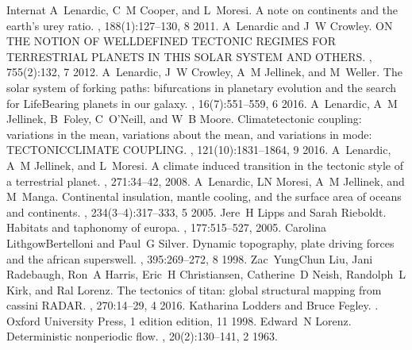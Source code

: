 \documentclass[letterpaper,10pt,english]{jupyterBook}
\begin{document}
\begin{sphinxthebibliography}{Internat}
\sphinxAtStartPar
A Lenardic, C M Cooper, and L Moresi. A note on continents and the earth's urey ratio. , 188(1):127–130, 8 2011.
\sphinxAtStartPar
A Lenardic and J W Crowley. ON THE NOTION OF WELL\sphinxhyphen{}DEFINED TECTONIC REGIMES FOR TERRESTRIAL PLANETS IN THIS SOLAR SYSTEM AND OTHERS. , 755(2):132, 7 2012.
\sphinxAtStartPar
A Lenardic, J W Crowley, A M Jellinek, and M Weller. The solar system of forking paths: bifurcations in planetary evolution and the search for Life\sphinxhyphen{}Bearing planets in our galaxy. , 16(7):551–559, 6 2016.
\sphinxAtStartPar
A Lenardic, A M Jellinek, B Foley, C O'Neill, and W B Moore. Climate\sphinxhyphen{}tectonic coupling: variations in the mean, variations about the mean, and variations in mode: TECTONIC\sphinxhyphen{}CLIMATE COUPLING. , 121(10):1831–1864, 9 2016.
\sphinxAtStartPar
A Lenardic, A M Jellinek, and L Moresi. A climate induced transition in the tectonic style of a terrestrial planet. , 271:34–42, 2008.
\sphinxAtStartPar
A Lenardic, L\sphinxhyphen{}N Moresi, A M Jellinek, and M Manga. Continental insulation, mantle cooling, and the surface area of oceans and continents. , 234(3–4):317–333, 5 2005.
\sphinxAtStartPar
Jere H Lipps and Sarah Rieboldt. Habitats and taphonomy of europa. , 177:515–527, 2005.
\sphinxAtStartPar
Carolina Lithgow\sphinxhyphen{}Bertelloni and Paul G Silver. Dynamic topography, plate driving forces and the african superswell. , 395:269–272, 8 1998.
\sphinxAtStartPar
Zac Yung\sphinxhyphen{}Chun Liu, Jani Radebaugh, Ron A Harris, Eric H Christiansen, Catherine D Neish, Randolph L Kirk, and Ral Lorenz. The tectonics of titan: global structural mapping from cassini RADAR. , 270:14–29, 4 2016.
\sphinxAtStartPar
Katharina Lodders and Bruce Fegley. . Oxford University Press, 1 edition edition, 11 1998.
\sphinxAtStartPar
Edward N Lorenz. Deterministic nonperiodic flow. , 20(2):130–141, 2 1963.

\end{sphinxthebibliography}
\end{document}
